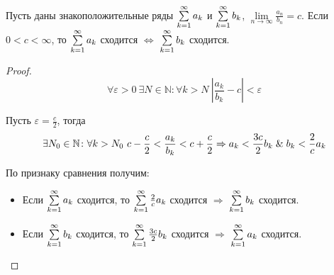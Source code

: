\begin{theorem}
Пусть даны знакоположительные ряды $\series a_k$ и $\series b_k$, $\lim\limits_{n \to \infty} \frac{a_n}{b_n} = c$.
Если $0 < c < \infty$, то $\series a_k$ сходится $\Leftrightarrow$ $\series b_k$ сходится.
\end{theorem}
\begin{proof}
\begin{equation*}
\forall \varepsilon > 0 \ \exists N \in \mathbb N \colon \forall k > N \ \left| \frac{a_k}{b_k} - c \right| < \varepsilon
\end{equation*}

Пусть $\varepsilon = \frac{c}2$, тогда
\begin{equation*}
\exists N_0 \in \mathbb N \colon \forall k > N_0 \ c - \frac{c}2 < \frac{a_k}{b_k} < c + \frac{c}2 \Rightarrow
a_k < \frac{3c}2 b_k \mathrel{\&} b_k < \frac2c a_k
\end{equation*}

По признаку сравнения получим:
\begin{itemize}
	\item Если $\series a_k$ сходится, то $\series \frac2c a_k$ сходится $\Rightarrow$ $\series b_k$ сходится.
	\item Если $\series b_k$ сходится, то $\series \frac{3c}2 b_k$ сходится $\Rightarrow$ $\series a_k$ сходится.
\end{itemize}
\end{proof}

